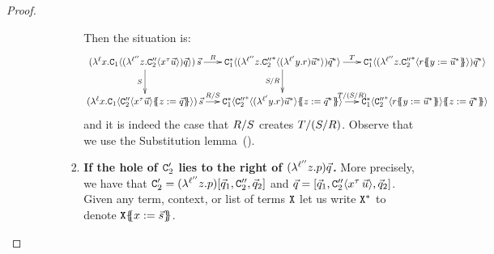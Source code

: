 \begin{proof}
\begin{enumerate}
\begin{enumerate}
\begin{enumerate}
\begin{enumerate}
        Then the situation is:
        {\footnotesize
        \[
          \xymatrix@C=.5cm{
            (\lamp{\lab}{\var}{\con_1\of{  (\lamp{\labthree}{\varthree}{\con''_2\of{\var^{\typ}\ls{\tmthree}} })\ls{\tmsix} }})\,\ls{\tmtwo}
            \ar[r]^-{\redex}
            \ar[d]_-{\redextwo}
          &
            \con_1^*\of{  (\lamp{\labthree}{\varthree}{{\con''_2}^*\of{(\lamp{\labtwo}{\vartwo}{\tmfour})\ls{\tmthree}^*} })\ls{\tmsix}^* }
            \ar[d]_-{\redextwo/\redex}
            \ar[r]^-{\redexthree}
          &
            \con_1^*\of{  (\lamp{\labthree}{\varthree}{{\con''_2}^*\of{ \tmfour\sub{\vartwo}{\ls{\tmthree}^*} } })\ls{\tmsix}^* }
          \\
            (\lamp{\lab}{\var}{\con_1\of{  \con''_2\of{\var^{\typ}\ls{\tmthree}} \sub{\varthree}{\ls{\tmsix}} }})\,\ls{\tmtwo}
            \ar[r]^-{\redex/\redextwo}
          &
            \con_1^*\of{  {\con''_2}^*\of{(\lamp{\labtwo}{\vartwo}{\tmfour})\ls{\tmthree}^*} \sub{\varthree}{\ls{\tmsix}^*} }
            \ar[r]^-{\redexthree/(\redextwo/\redex)}
          &
            \con_1^*\of{  {\con''_2}^*\of{ \tmfour\sub{\vartwo}{\ls{\tmthree}^*} } \sub{\varthree}{\ls{\tmsix}^*} }
          }
        \]}
        and it is indeed the case that $R/S$ creates $T/(S/R)$.
        Observe that we use the Substitution lemma~().
      \item {\bf If the hole of $\mathtt{C}'_2$ lies to the right of $(\lambda^{\ell''} z. p)\vec{q}$.}
        More precisely, we have that $\mathtt{C}'_2 = (\lambda^{\ell''} z. p)[\vec{q}_1,\mathtt{C}''_2,\vec{q}_2]$
        and $\vec{q} = [\vec{q}_1,\mathtt{C}''_2\langle x^\tau\,\vec{u}\rangle,\vec{q}_2]$.
        Given any term, context, or list of terms $\mathtt{X}$ let us write $\mathtt{X}^*$ to denote $\mathtt{X}\{\!\!\{x := \vec{s}\}\!\!\}$.


\end{enumerate}
\end{enumerate}
\end{enumerate}
\end{enumerate}
\end{proof}
